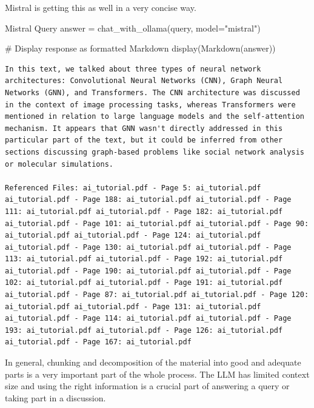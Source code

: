 Mistral is getting this as well in a very concise way. 

\begin{codeonly}{Mistral Query}
answer = chat_with_ollama(query, model="mistral")

# Display response as formatted Markdown
display(Markdown(answer))
\end{codeonly}

\lstset{language=}
\begin{lstlisting}
In this text, we talked about three types of neural network architectures: Convolutional Neural Networks (CNN), Graph Neural Networks (GNN), and Transformers. The CNN architecture was discussed in the context of image processing tasks, whereas Transformers were mentioned in relation to large language models and the self-attention mechanism. It appears that GNN wasn't directly addressed in this particular part of the text, but it could be inferred from other sections discussing graph-based problems like social network analysis or molecular simulations.

Referenced Files: ai_tutorial.pdf - Page 5: ai_tutorial.pdf ai_tutorial.pdf - Page 188: ai_tutorial.pdf ai_tutorial.pdf - Page 111: ai_tutorial.pdf ai_tutorial.pdf - Page 182: ai_tutorial.pdf ai_tutorial.pdf - Page 101: ai_tutorial.pdf ai_tutorial.pdf - Page 90: ai_tutorial.pdf ai_tutorial.pdf - Page 124: ai_tutorial.pdf ai_tutorial.pdf - Page 130: ai_tutorial.pdf ai_tutorial.pdf - Page 113: ai_tutorial.pdf ai_tutorial.pdf - Page 192: ai_tutorial.pdf ai_tutorial.pdf - Page 190: ai_tutorial.pdf ai_tutorial.pdf - Page 102: ai_tutorial.pdf ai_tutorial.pdf - Page 191: ai_tutorial.pdf ai_tutorial.pdf - Page 87: ai_tutorial.pdf ai_tutorial.pdf - Page 120: ai_tutorial.pdf ai_tutorial.pdf - Page 131: ai_tutorial.pdf ai_tutorial.pdf - Page 114: ai_tutorial.pdf ai_tutorial.pdf - Page 193: ai_tutorial.pdf ai_tutorial.pdf - Page 126: ai_tutorial.pdf ai_tutorial.pdf - Page 167: ai_tutorial.pdf
\end{lstlisting}

In general, chunking and decomposition of the material into good and adequate parts is a very important part of the whole process. The LLM has limited context size and using the right information is a crucial part of answering a query or taking part in a discussion. 